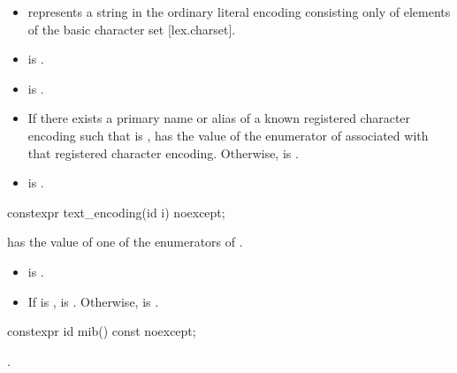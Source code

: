 \documentclass{wg21}
\begin{document}
\begin{addedblock}
\begin{itemdescr}
    \preconditions
    \begin{itemize}
        \item {} represents a string in the ordinary literal encoding consisting only of elements of the basic character set [lex.charset].
        \item {} is .
        \item {} is .
    \end{itemize}
    \postconditions
    \begin{itemize}
         \item If there exists a primary name or alias  of a known registered character encoding such that  is ,  has the value of the enumerator of  associated with that registered character encoding. Otherwise,  is .
         \item  {} is .
    \end{itemize}
\end{itemdescr}


\begin{itemdecl}
constexpr text_encoding(id i) noexcept;
\end{itemdecl}

\begin{itemdescr}
    \preconditions
     has the value of one of the enumerators of .

    \postconditions
    \begin{itemize}
       \item  {} is .
       \item  If  is ,  is . Otherwise,
        is .
    \end{itemize}
\end{itemdescr}


\begin{itemdecl}
constexpr id mib() const noexcept;
\end{itemdecl}

\begin{itemdescr}
\returns {}.


\end{itemdescr}
\end{addedblock}
\end{document}
